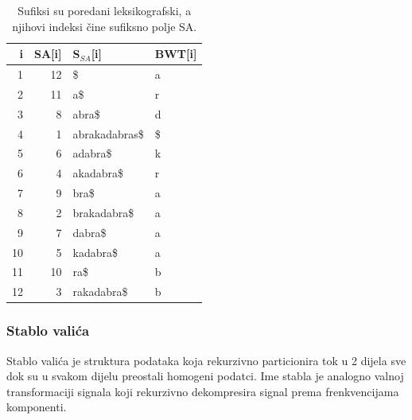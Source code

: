 \documentclass[a4paper,12pt]{article}
\begin{document}
\begin{table}[h!]
	\caption{Sufiksi su poredani leksikografski, a njihovi indeksi čine sufiksno polje SA.}
	\label{tablePrimjer2}
	\begin{center}
		\begin{tabular}{rrll}
			\toprule
			i & SA[i] & S$_{SA}$[i] & BWT[i] \\
			\midrule
			1 & 12 & \$ & a\\
			2 & 11 &  a\$ & r \\
			3 & 8 & abra\$ & d \\
			4 & 1 & abrakadabras\$ & \$ \\
			5 & 6 & adabra\$ & k \\
			6 & 4 & akadabra\$ & r \\
			7 & 9 & bra\$ & a\\
			8 & 2 & brakadabra\$ & a\\
			9 & 7 & dabra\$ & a \\
			10 & 5 & kadabra\$ & a\\
			11 & 10 & ra\$ & b \\
			12 & 3 & rakadabra\$ & b\\
			\bottomrule
		\end{tabular}
	\end{center}
\end{table}

\newpage

\subsubsection{Stablo valića}
\label{WT_defincija}

Stablo valića je struktura podataka koja rekurzivno particionira tok u 2 dijela sve dok su u svakom dijelu preostali homogeni podatci. Ime stabla je analogno valnoj transformaciji signala koji rekurzivno dekompresira signal prema frenkvencijama komponenti. 
\end{document}
